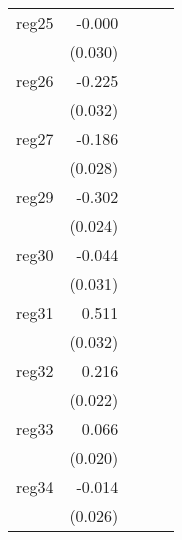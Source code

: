 {\begin{longtable}{l*{4}{D{.}{.}{-1}}}
\addlinespace
reg25       &      -0.000         &                     &                     &                     \\
            &     (0.030)         &                     &                     &                     \\
\addlinespace
reg26       &      -0.225\sym{***}&                     &                     &                     \\
            &     (0.032)         &                     &                     &                     \\
\addlinespace
reg27       &      -0.186\sym{***}&                     &                     &                     \\
            &     (0.028)         &                     &                     &                     \\
\addlinespace
reg29       &      -0.302\sym{***}&                     &                     &                     \\
            &     (0.024)         &                     &                     &                     \\
\addlinespace
reg30       &      -0.044         &                     &                     &                     \\
            &     (0.031)         &                     &                     &                     \\
\addlinespace
reg31       &       0.511\sym{***}&                     &                     &                     \\
            &     (0.032)         &                     &                     &                     \\
\addlinespace
reg32       &       0.216\sym{***}&                     &                     &                     \\
            &     (0.022)         &                     &                     &                     \\
\addlinespace
reg33       &       0.066\sym{**} &                     &                     &                     \\
            &     (0.020)         &                     &                     &                     \\
\addlinespace
reg34       &      -0.014         &                     &                     &                     \\
            &     (0.026)         &                     &                     &                     \\

\end{longtable}}
